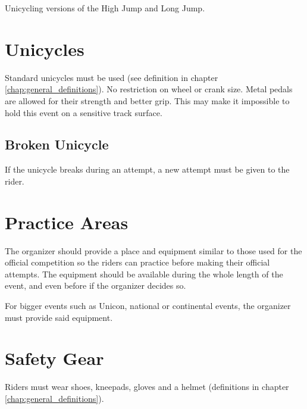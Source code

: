
Unicycling versions of the High Jump and Long Jump.

\section{Unicycles}
Standard unicycles must be used (see definition in chapter \ref{chap:general_definitions}).
No restriction on wheel or crank size.
Metal pedals are allowed for their strength and better grip.
This may make it impossible to hold this event on a sensitive track surface.

\subsection{Broken Unicycle}
If the unicycle breaks during an attempt, a new attempt must be given to the rider.

\section{Practice Areas}
The organizer should provide a place and equipment similar to those used for the official competition so the riders can practice before making their official attempts.
The equipment should be available during the whole length of the event, and even before if the organizer decides so.

For bigger events such as Unicon, national or continental events, the organizer must provide said equipment.

\section{Safety Gear}
Riders must wear shoes, kneepads, gloves and a helmet (definitions in chapter \ref{chap:general_definitions}).

